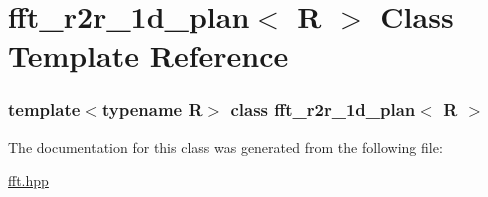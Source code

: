 \hypertarget{classfft__r2r__1d__plan}{
\section{fft\_\-r2r\_\-1d\_\-plan$<$ R $>$ Class Template Reference}
\label{classfft__r2r__1d__plan}
}
\subsubsection*{template$<$typename R$>$ class fft\_\-r2r\_\-1d\_\-plan$<$ R $>$}



The documentation for this class was generated from the following file:\begin{DoxyCompactItemize}
\item 
\hyperlink{fft_8hpp}{fft.hpp}\end{DoxyCompactItemize}
